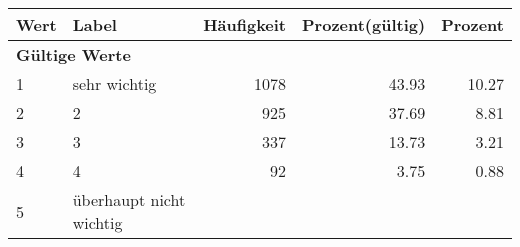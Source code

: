      \begin{longtable}{lXrrr}
     \toprule
     \textbf{Wert} & \textbf{Label} & \textbf{Häufigkeit} & \textbf{Prozent(gültig)} & \textbf{Prozent} \\
     \endhead
     \midrule
     \multicolumn{5}{l}{\textbf{Gültige Werte}}\\

     1 &
     \multicolumn{1}{X}{ sehr wichtig   } &


       \num{1078} &
       \num[round-mode=places,round-precision=2]{43,93} &
         \num[round-mode=places,round-precision=2]{10,27} \\

     2 &
     \multicolumn{1}{X}{ 2   } &


       \num{925} &
       \num[round-mode=places,round-precision=2]{37,69} &
         \num[round-mode=places,round-precision=2]{8,81} \\

     3 &
     \multicolumn{1}{X}{ 3   } &


       \num{337} &
       \num[round-mode=places,round-precision=2]{13,73} &
         \num[round-mode=places,round-precision=2]{3,21} \\

     4 &
     \multicolumn{1}{X}{ 4   } &


       \num{92} &
       \num[round-mode=places,round-precision=2]{3,75} &
         \num[round-mode=places,round-precision=2]{0,88} \\

     5 &
     \multicolumn{1}{X}{ überhaupt nicht wichtig   } &



\end{longtable}
